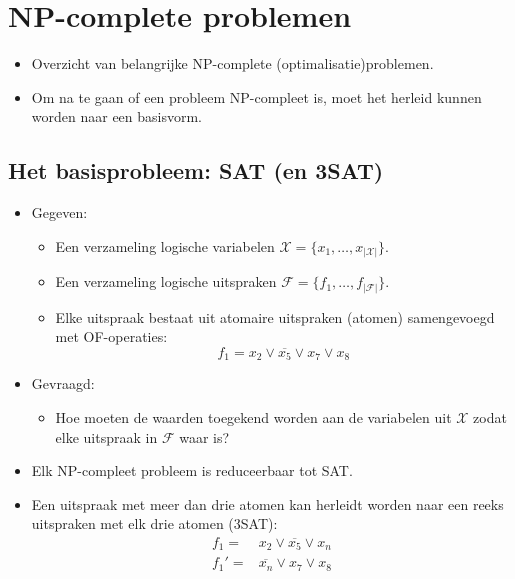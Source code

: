 \section{NP-complete problemen}

\begin{itemize}
    \item Overzicht van belangrijke NP-complete (optimalisatie)problemen.
    \item Om na te gaan of een probleem NP-compleet is, moet het herleid kunnen worden naar een basisvorm.
\end{itemize}

\subsection{Het basisprobleem: SAT (en 3SAT)}
\begin{itemize}
    \item Gegeven:
    \begin{itemize}
        \item Een verzameling logische variabelen $\mathcal{X} = \{x_1, \dots, x_{|\mathcal{X}|}\}$.
        \item Een verzameling logische uitspraken $\mathcal{F} = \{f_1, \dots, f_{|\mathcal{F}|}\}$.
        \item Elke uitspraak bestaat uit atomaire uitspraken (atomen) samengevoegd met OF-operaties:
        $$f_1 = x_2 \vee \overline{x_5} \vee x_7 \vee x_8$$
    \end{itemize}
    \item Gevraagd:
    \begin{itemize}
        \item  Hoe moeten de waarden toegekend worden aan de variabelen uit $\mathcal{X}$ zodat elke uitspraak in $\mathcal{F}$ waar is?
    \end{itemize}
    \item Elk NP-compleet probleem is reduceerbaar tot SAT.
    \item Een uitspraak met meer dan drie atomen kan herleidt worden naar een reeks uitspraken met elk drie atomen (3SAT):
    \begin{align*}
        f_1 = &x_2 \vee \overline{x_5} \vee x_n \\
        f_1' = &\overline{x_n} \vee x_7 \vee x_8
    \end{align*}
\end{itemize}

